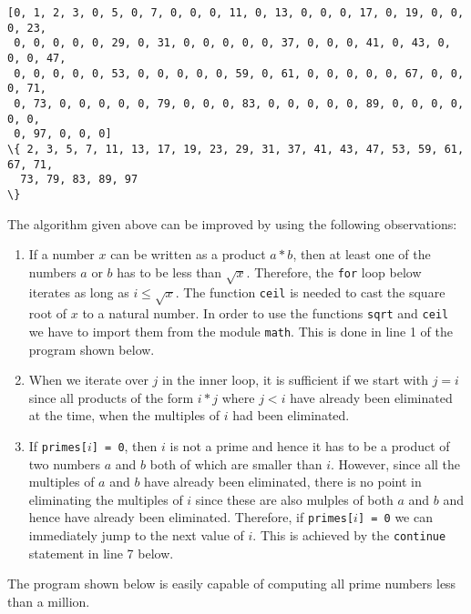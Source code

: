 \begin{Verbatim}[commandchars=\\\{\}]
[0, 1, 2, 3, 0, 5, 0, 7, 0, 0, 0, 11, 0, 13, 0, 0, 0, 17, 0, 19, 0, 0, 0, 23,
 0, 0, 0, 0, 0, 29, 0, 31, 0, 0, 0, 0, 0, 37, 0, 0, 0, 41, 0, 43, 0, 0, 0, 47,
 0, 0, 0, 0, 0, 53, 0, 0, 0, 0, 0, 59, 0, 61, 0, 0, 0, 0, 0, 67, 0, 0, 0, 71,
 0, 73, 0, 0, 0, 0, 0, 79, 0, 0, 0, 83, 0, 0, 0, 0, 0, 89, 0, 0, 0, 0, 0, 0,
 0, 97, 0, 0, 0]
\{ 2, 3, 5, 7, 11, 13, 17, 19, 23, 29, 31, 37, 41, 43, 47, 53, 59, 61, 67, 71,
  73, 79, 83, 89, 97
\}
\end{Verbatim}
The algorithm given above can be improved by using the following observations:
\begin{enumerate}
\item If a number $x$ can be written as a product $a * b$, then at least one of the numbers $a$ or $b$ has to
      be less than $\sqrt{x}$.  Therefore, the \texttt{for} loop below iterates as long as $i \leq
      \sqrt{x}$.
      The function \texttt{ceil} is needed to cast the square root of $x$ to a natural number.  In
      order to use the functions \texttt{sqrt} and \texttt{ceil} we have to import them from the module
      \texttt{math}.  This is done in line 1 of the program shown below.  
\item When we iterate over $j$ in the inner loop, it is sufficient if we start with $j = i$ since all products
      of the form $i * j$ where $j < i$ have already been eliminated at the time, when the multiples of $i$ had
      been eliminated. 
\item If \texttt{primes[$i$] = 0}, then $i$ is not a prime and hence it has to be a product of two numbers $a$
      and $b$ both of which are smaller than $i$.  However, since all the multiples of $a$ and $b$ have already
      been eliminated, there is no point in eliminating the multiples of $i$ since these are also mulples of both
      $a$ and $b$ and hence have already been eliminated.  Therefore, if \texttt{primes[$i$] = 0} we can
      immediately jump to the next value of $i$.  This is achieved by the \texttt{continue} statement in line 7
      below. 
\end{enumerate}
The program shown below is easily capable of computing all prime numbers less than a million.

